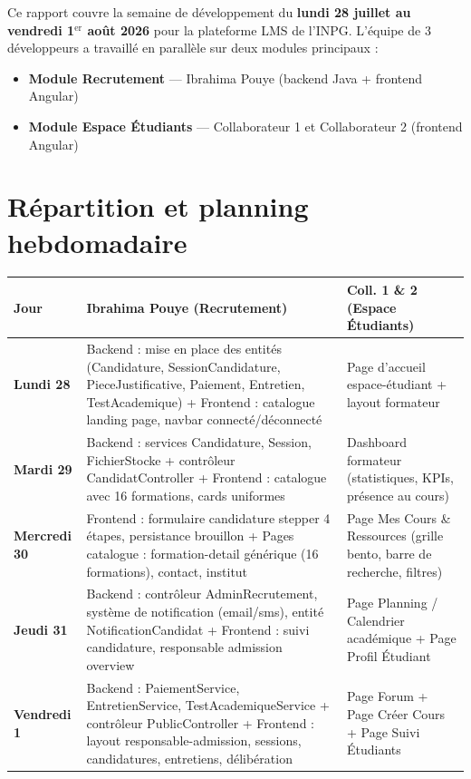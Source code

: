 \documentclass[a4paper,12pt,french]{article}
\begin{document}
Ce rapport couvre la semaine de développement du \textbf{lundi 28 juillet au vendredi 1$^\text{er}$ août 2026} pour la plateforme LMS de l'INPG. L'équipe de 3 développeurs a travaillé en parallèle sur deux modules principaux :

\begin{itemize}
    \item \textbf{Module Recrutement} — Ibrahima Pouye (backend Java + frontend Angular)
    \item \textbf{Module Espace Étudiants} — Collaborateur 1 et Collaborateur 2 (frontend Angular)
\end{itemize}

\section{Répartition et planning hebdomadaire}

\begin{center}
\begin{tabular}{|p{2cm}|p{6cm}|p{6cm}|}
\hline
\textbf{Jour} & \textbf{Ibrahima Pouye (Recrutement)} & \textbf{Coll. 1 \& 2 (Espace Étudiants)} \\
\hline
\addlinespace
\textbf{Lundi 28} &
Backend : mise en place des entités (Candidature, SessionCandidature, PieceJustificative, Paiement, Entretien, TestAcademique) +
Frontend : catalogue landing page, navbar connecté/déconnecté &
Page d'accueil espace-étudiant + layout formateur \\
\hline
\addlinespace
\textbf{Mardi 29} &
Backend : services Candidature, Session, FichierStocke + contrôleur CandidatController +
Frontend : catalogue avec 16 formations, cards uniformes &
Dashboard formateur (statistiques, KPIs, présence au cours) \\
\hline
\addlinespace
\textbf{Mercredi 30} &
Frontend : formulaire candidature stepper 4 étapes, persistance brouillon +
Pages catalogue : formation-detail générique (16 formations), contact, institut &
Page Mes Cours \& Ressources (grille bento, barre de recherche, filtres) \\
\hline
\addlinespace
\textbf{Jeudi 31} &
Backend : contrôleur AdminRecrutement, système de notification (email/sms), entité NotificationCandidat +
Frontend : suivi candidature, responsable admission overview &
Page Planning / Calendrier académique + Page Profil Étudiant \\
\hline
\addlinespace
\textbf{Vendredi 1} &
Backend : PaiementService, EntretienService, TestAcademiqueService + contrôleur PublicController +
Frontend : layout responsable-admission, sessions, candidatures, entretiens, délibération &
Page Forum + Page Créer Cours + Page Suivi Étudiants \\
\hline
\end{tabular}
\end{center}
\end{document}

